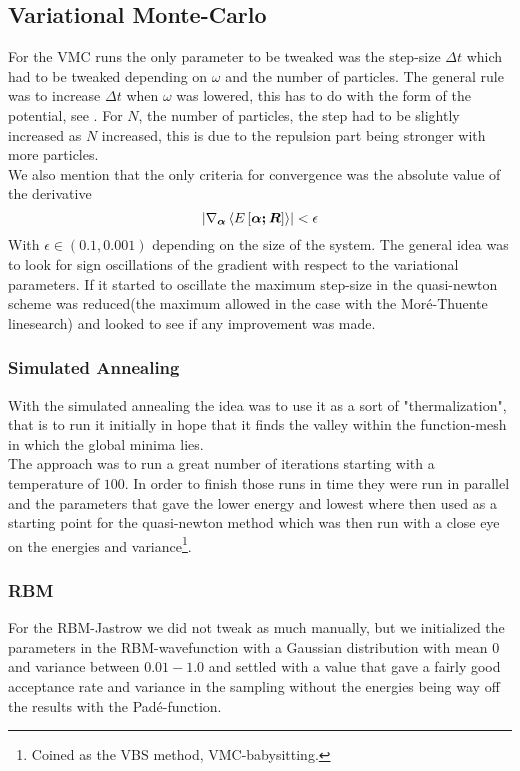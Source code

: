 \subsection{Variational Monte-Carlo}
    For the VMC runs the only parameter to be tweaked was the step-size $\Delta
    t$ which had to be tweaked depending on $\omega$ and the number of
    particles. The general rule was to increase $\Delta t$ when $\omega$ was
    lowered, this has to do with the form of the potential, see
    . For $N$, the number of particles, the step had to be
    slightly increased as $N$ increased, this is due to the repulsion part
    being stronger with more particles. \\
    We also mention that the only criteria for convergence was the absolute
    value of the derivative
        \begin{equation}
            \abs{\nabla_{\boldsymbol{{\alpha}}}\left< {E\left[\boldsymbol{{\alpha;\boldsymbol{{R}}}}\right]} \right>}
            < \epsilon
        \end{equation}
    With $\epsilon\in(0.1,0.001)$ depending on the size of the system. The
    general idea was to look for sign oscillations of the gradient with respect
    to the variational parameters. If it started to oscillate the maximum
    step-size in the quasi-newton scheme was reduced(the maximum allowed in the
    case with the Mor\'e-Thuente linesearch) and looked to see if any
    improvement was made.

\subsubsection{Simulated Annealing}
    With the simulated annealing the idea was to use it as a sort of
    "thermalization", that is to run it initially in hope that it finds the
    valley within the function-mesh in which the global minima lies. \\ 
    The approach was to run a great number of iterations starting with a
    temperature of $100$. In order to finish those runs in time they were run
    in parallel and the parameters that gave the lower energy and lowest where
    then used as a starting point for the quasi-newton method which was then
    run with a close eye on the energies and variance\footnote{Coined as the
    VBS method, VMC-babysitting.}.

\subsubsection{RBM}
    For the RBM-Jastrow we did not tweak as much manually, but we initialized
    the parameters in the RBM-wavefunction with a Gaussian distribution with
    mean $0$ and variance between $0.01-1.0$ and settled with a value that gave
    a fairly good acceptance rate and variance in the sampling without the
    energies being way off the results with the Pad\'e-function.

